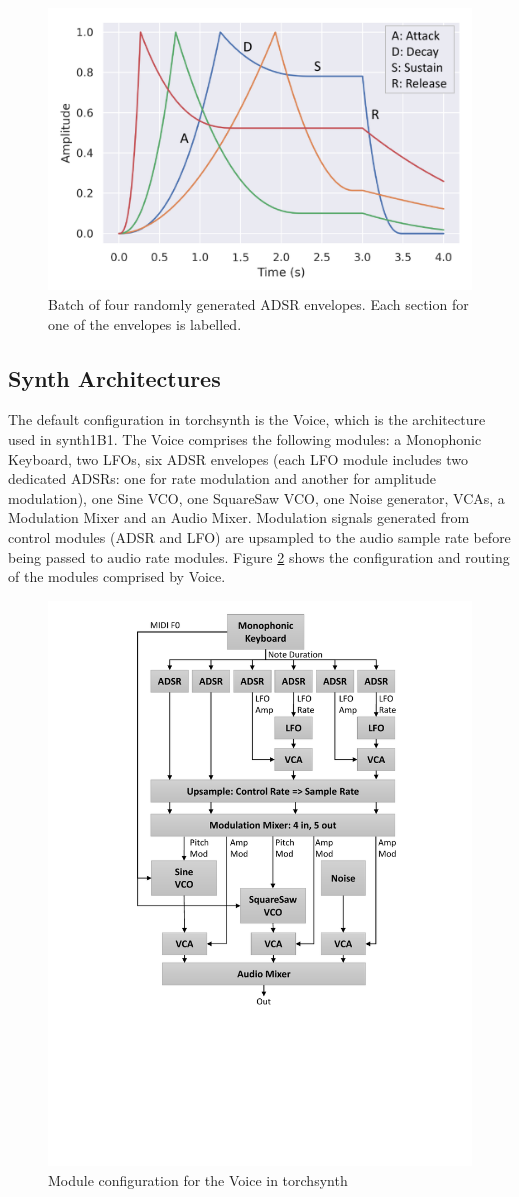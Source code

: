 \begin{figure}[t]
    \centering
    \includegraphics[width=0.66\linewidth]{ADSR.pdf}
  \vspace{-1.5em}
    \caption{Batch of four randomly generated ADSR envelopes.
    Each section for one of the envelopes is labelled.}
    \label{fig:adsr}
\end{figure}

\subsection{Synth Architectures}

The default configuration in torchsynth is the Voice, which is the architecture used in synth1B1. The Voice comprises the following modules: a Monophonic Keyboard, two LFOs, six ADSR envelopes (each LFO module includes two dedicated ADSRs: one for rate modulation and another for amplitude modulation), one Sine VCO, one SquareSaw VCO, one Noise generator, VCAs, a Modulation Mixer and an Audio Mixer. Modulation signals generated from control modules (ADSR and LFO) are upsampled to the audio sample rate before being passed to audio rate modules. Figure \ref{fig:voice_diagram} shows the configuration and routing of the modules comprised by Voice. 

\begin{figure}[t]
    \centering
    \includegraphics[width=0.5\linewidth]{SynthDiagram_3.pdf}
  \vspace{-1.5em}
    \caption{Module configuration for the Voice in torchsynth}
    \label{fig:voice_diagram}
\end{figure}

